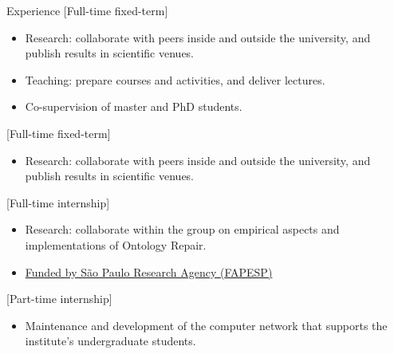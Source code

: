 %

\begin{rSection}{Experience}
    [Full-time fixed-term]{%
        \begin{itemize}
            \item Research: collaborate with peers inside and outside the university, and publish results in scientific venues.
            \item Teaching: prepare courses and activities, and deliver lectures.
            \item Co-supervision of master and PhD students.
        \end{itemize}%
    }

    [Full-time fixed-term]{%
        \begin{itemize}
            \item Research: collaborate with peers inside and outside the university, and publish results in scientific venues.
        \end{itemize}%
    }

    [Full-time internship]{%
        \begin{itemize}
            \item Research: collaborate within the group on empirical aspects and implementations of Ontology Repair.
            \item \href{https://bv.fapesp.br/en/bolsas/176114/improving-efficiency-of-belief-base-change-in-description-logics-with-modularity-in-ontologies/}{Funded by São Paulo Research Agency ({FAPESP})}
        \end{itemize}%
    }

    [Part-time internship]{%
        \begin{itemize}
            \item Maintenance and development of the computer network that supports the institute's undergraduate students.
        \end{itemize}%
    }
\end{rSection}
